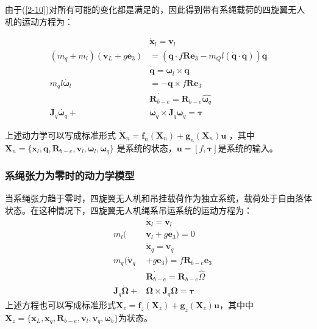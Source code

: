 \documentclass[lang=chs, degree=master, blindreview=false, winfonts=true]{yanputhesis}
\begin{document}
由于(\ref{2-10})对所有可能的变化都是满足的，因此得到带有系绳载荷的四旋翼无人机的运动方程为：

\begin{equation}
	\begin{aligned}
		&\dot{\bm x}_{l}=\bm v_{l} \\
		(m_q+m_l)(\dot{\bm v}_L+g\bm e_3)& =(\bm q\cdot f\bm R\bm e_3-m_Ql(\dot{\bm q}\cdot\dot{\bm q}))\bm q \\
		&\dot{\bm q}=\bm \omega_l\times \bm q \\
		m_{q}l \dot{\bm \omega_l}&=-\bm q\times f\bm R\bm e_{3} \\
		&\dot{\bm R_{b-e}}=\bm R_{b-e}\hat{\bm  \omega_q} \\
		\bm J_{q}\dot{\bm  \omega_q}+&\bm  \omega_q\times \bm J_{q}\bm  \omega_q=\bm \tau
	\end{aligned}
\end{equation}

上述动力学可以写成标准形式 $\dot{\bm X}_n=\bm f_n(\bm X_n)+\bm g_n(\bm X_n)\bm u$ ，其中 $\bm X_n = \{\bm x_l,\bm q,\bm R_{b-e},\bm v_l,\bm \omega_l,\bm \omega_q\}$ 是系统的状态，$\bm u = \left[f,\bm \tau \right]$是系统的输入。
\subsubsection{系绳张力为零时的动力学模型}
当系绳张力趋于零时，四旋翼无人机和吊挂载荷作为独立系统，载荷处于自由落体状态。在这种情况下，四旋翼无人机绳系吊运系统的运动方程为：
\begin{equation}
	\begin{aligned}
	&\dot{\bm x}_{l}=\bm v_{l}\\
	\quad m_{l}(&\dot{\bm v}_{l}+g\bm e_{3})=0\\
	&\dot{\bm x}_{q}=\bm v_{q}\\
	\quad m_{q}(\dot{\bm v}_{q}&+g\bm e_{3})=f\bm R_{b-e}\bm e_{3}\\
	&\dot{\bm R_{b-e}}=\bm R_{b-e}\hat{\Omega}\\
	\quad \bm J_{q}\dot{\bm \Omega}+&\bm \Omega\times \bm J_{q}\bm \Omega=\bm \tau
\end{aligned}
\end{equation}
上述方程也可以写成标准形式$\dot{\bm X}_z=\bm f_z(\bm X_z)+\bm g_z(\bm X_z)\bm u$，其中中$\bm X_z = \{\bm x_L,\bm x_q,\bm R_{b-e},\bm v_l,\bm v_q,\bm \omega_b\}$为状态。
\end{document}
